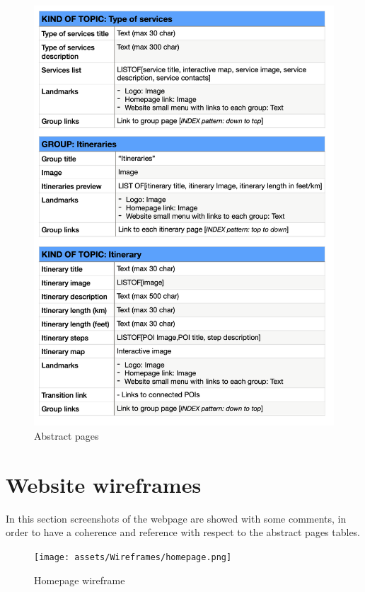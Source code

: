 \documentclass[table, 12pt]{article}
\begin{document}
\begin{figure}[H]
    \begin{center}
        \includegraphics[width=\textwidth]{assets/Tables/Abstract/abstractPage5.png}
        \caption{Abstract pages}
    \end{center}
\end{figure}

\section{Website wireframes}
In this section screenshots of the webpage are showed with some comments, in order to have a coherence and reference with respect to the abstract pages tables.
\begin{figure}[H]
    \begin{center}
        \texttt{[image: assets/Wireframes/homepage.png]}
        \caption{Homepage wireframe}
    \end{center}
\end{figure}
\end{document}
